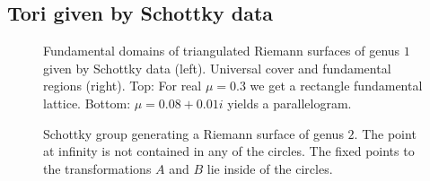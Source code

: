 \documentclass[Thesis]{subfiles}
\begin{document}
\subsection{Tori given by Schottky data}
\label{sec:tori_schottky}
\begin{figure}
\centering
{}
\caption{
Fundamental domains of triangulated Riemann surfaces of genus $1$ given by Schottky data (left). 
Universal cover and fundamental regions (right). 
Top: For real $\mu=0.3$ we get a rectangle fundamental lattice. 
Bottom: $\mu=0.08+0.01i$ yields a parallelogram.
}
\label{fig:schottky_g1}
\end{figure}

\begin{figure} 
\centering 
\scalebox{1.0}{}
\caption{
Schottky group generating a Riemann surface of genus $2$. 
The point at infinity is not contained in any of the circles. 
The fixed points to the transformations $A$ and $B$ lie inside of the circles.
} 
\label{fig:schottky_group}
\end{figure}
\end{document}
